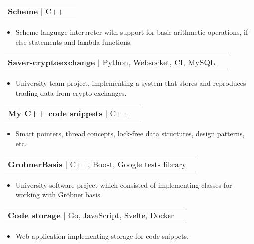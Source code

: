 \documentclass[letterpaper,11pt]{article}
\makeatletter
\newcommand{\resumeItem}[1]{
  \item\small{
    {#1 \vspace{-2pt}}
  }
}
\newcommand{\resumeProjectHeading}[2]{
    \item
    \begin{tabular*}{1.001\textwidth}{l@{\extracolsep{\fill}}r}
      \small#1 & \textbf{\small #2}\\
    \end{tabular*}\vspace{-7pt}
}
\newcommand{\resumeItemListStart}{\begin{itemize}}
\newcommand{\resumeItemListEnd}{\end{itemize}\vspace{-5pt}}
\makeatother
\begin{document}
      \resumeProjectHeading
          {\href{https://github.com/fdr896/scheme}{\textbf{\large{\underline{Scheme}}} \href{https://github.com/fdr896/scheme}{\raisebox{-0.1\height}\faExternalLink }} $|$ \large{\underline{C++}}}{}
          \resumeItemListStart
            \resumeItem{\normalsize{Scheme language interpreter with support for basic arithmetic operations, if-else statements and lambda functions.}}
          \resumeItemListEnd
          \vspace{-13pt}
          
      \resumeProjectHeading
          {\href{https://github.com/egor-bystepdev/saver-cryptoexchange}{\textbf{\large{\underline{Saver-cryptoexchange}}} \href{https://github.com/egor-bystepdev/saver-cryptoexchange}{\raisebox{-0.1\height}\faExternalLink }} $|$ \large{\underline{Python, Websocket, CI, MySQL}}}{}
          \resumeItemListStart
            \resumeItem{\normalsize{ University team project, implementing a system that stores and reproduces trading data from crypto-exchanges. }}
          \resumeItemListEnd
          \vspace{-13pt}
          
      \resumeProjectHeading
          {\href{https://github.com/fdr896/cpp_libs}{\textbf{\large{\underline{My C++ code snippets}}} \href{https://github.com/fdr896/cpp_libs}{\raisebox{-0.1\height}\faExternalLink }} $|$ \large{\underline{C++}}}{}
          \resumeItemListStart
            \resumeItem{\normalsize{Smart pointers, thread concepts, lock-free data structures, design patterns, etc.}}
          \resumeItemListEnd
          \vspace{-13pt}
          
      \resumeProjectHeading
          {\href{https://github.com/fdr896/GrobnerBasis/tree/dev}{\textbf{\large{\underline{GrobnerBasis}}} \href{https://github.com/fdr896/GrobnerBasis/tree/dev}{\raisebox{-0.1\height}\faExternalLink }} $|$ \large{\underline{C++, Boost, Google tests library}}}{}
          \resumeItemListStart
            \resumeItem{\normalsize{ University software project which consisted of implementing classes for working with Gröbner basis. }}
          \resumeItemListEnd
          \vspace{-13pt}
          
      \resumeProjectHeading
          {\href{https://github.com/fdr896/code_storage}{\textbf{\large{\underline{Code storage}}} \href{https://gitub.com/fdr896/code_storage}{\raisebox{-0.1\height}\faExternalLink }} $|$ \large{\underline{Go, JavaScript, Svelte, Docker}}}{}
          \resumeItemListStart
            \resumeItem{\normalsize{Web application implementing storage for code snippets.}}
          \resumeItemListEnd
          
\end{document}
